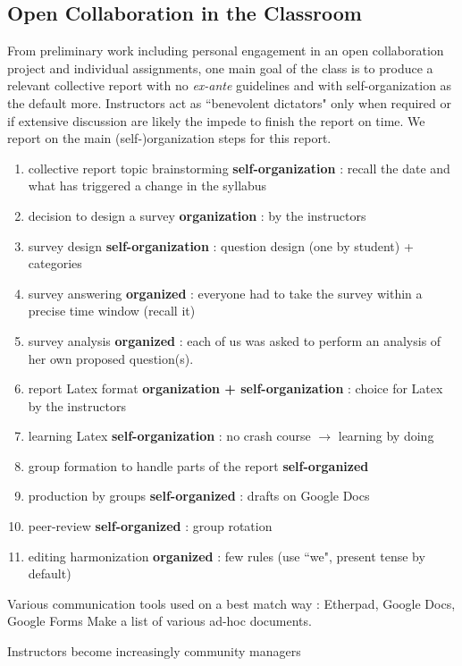 \subsection{Open Collaboration in the Classroom}
\label{opencollaborationintheclassroom}

From preliminary work including personal engagement in an open collaboration project and individual assignments, one main goal of the class is to produce a relevant collective report with no {\it ex-ante} guidelines and with self-organization as the default more. Instructors act as ``benevolent dictators" only when required or if extensive discussion are likely the impede to finish the report on time. We report on the main (self-)organization steps for this report.

\begin{enumerate}
  \item collective report topic brainstorming {\bf self-organization} : recall the date and what has triggered a change in the syllabus
  \item decision to design a survey {\bf organization} : by the instructors
  \item survey design {\bf self-organization} : question design (one by student) + categories
  \item survey answering {\bf organized} : everyone had to take the survey within a precise time window (recall it)
  \item survey analysis {\bf organized} :  each of us was asked to perform an analysis of her own proposed question(s).
  \item report Latex format {\bf organization + self-organization} : choice for Latex by the instructors
  \item learning Latex {\bf self-organization} : no crash course $\rightarrow$  learning by doing
  \item group formation to handle parts of the report {\bf self-organized}
  \item production by groups {\bf self-organized} : drafts on Google Docs
  \item peer-review {\bf self-organized} : group rotation
  \item editing harmonization {\bf organized} : few rules (use ``we", present tense by default)
\end{enumerate}


Various communication tools used on a best match way : Etherpad, Google Docs, Google Forms 
Make a list of various ad-hoc documents.


Instructors become increasingly community managers